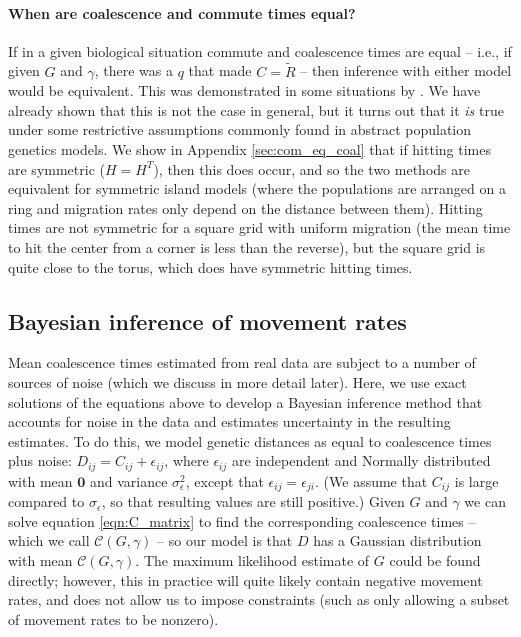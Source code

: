 \documentclass{article}
\newcommand{\comdist}{\widetilde{R}}
\begin{document}
\paragraph{When are coalescence and commute times equal?}
If in a given biological situation commute and coalescence times are equal --
i.e., if given $G$ and $\gamma$, there was a $q$ that made $C = \comdist$ --
then inference with either model would be equivalent.
This was demonstrated in some situations by \citet{mcrae2006isolation}.
We have already shown that this is not the case in general,
but it turns out that it \emph{is} true
under some restrictive assumptions commonly found in abstract population genetics models. 
We show in Appendix \ref{sec:com_eq_coal} that
if hitting times are symmetric ($H = H^T$),
then this does occur,
and so the two methods are equivalent for symmetric island models
(where the populations are arranged on a ring 
and migration rates only depend on the distance between them).
Hitting times are not symmetric for a square grid with uniform migration
(the mean time to hit the center from a corner is less than the reverse),
but the square grid is quite close to the torus, which does have symmetric hitting times.


\subsection*{Bayesian inference of movement rates}

Mean coalescence times estimated from real data are subject to a number of sources of noise
(which we discuss in more detail later).
Here, we use
exact solutions of the equations above
to develop a Bayesian inference method that accounts for noise in the data
and estimates uncertainty in the resulting estimates.
To do this, we model genetic distances as equal to coalescence times plus noise:
$D_{ij} = C_{ij} + \epsilon_{ij}$,
where $\epsilon_{ij}$ are independent and Normally distributed
with mean $\mathbf{0}$ and variance $\sigma_\epsilon^2$,
except that $\epsilon_{ij} = \epsilon_{ji}$.
(We assume that $C_{ij}$ is large compared to $\sigma_{\epsilon}$, 
so that resulting values are still positive.)
Given $G$ and $\gamma$ we can solve equation \eqref{eqn:C_matrix} 
to find the corresponding coalescence times
-- which we call $\mathcal{C}(G, \gamma)$ --
so our model is that $D$ has a Gaussian distribution 
with mean $\mathcal{C}(G, \gamma)$.
The maximum likelihood estimate of $G$ could be found directly;
however, this in practice will quite likely contain negative movement rates,
and does not allow us to impose constraints
(such as only allowing a subset of movement rates to be nonzero).
\end{document}
